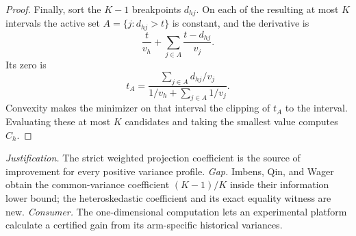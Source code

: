 \documentclass{article}
\begin{document}
\begin{proof}
Finally, sort the \(K-1\) breakpoints \(d_{hj}\). On each of the resulting at most \(K\) intervals the active set \(A=\{j:d_{hj}>t\}\) is constant, and the derivative is
\[
 \frac{t}{v_h}+\sum_{j\in A}\frac{t-d_{hj}}{v_j}.
\]
Its zero is
\[
 t_A=\frac{\sum_{j\in A}d_{hj}/v_j}
 {1/v_h+\sum_{j\in A}1/v_j}.
\]
Convexity makes the minimizer on that interval the clipping of \(t_A\) to the interval. Evaluating these at most \(K\) candidates and taking the smallest value computes \(C_h\).
\end{proof}
\par\smallskip\noindent \textit{Justification.} The strict weighted projection coefficient is the source of improvement for every positive variance profile. \textit{Gap.} Imbens, Qin, and Wager obtain the common-variance coefficient \((K-1)/K\) inside their information lower bound; the heteroskedastic coefficient and its exact equality witness are new. \textit{Consumer.} The one-dimensional computation lets an experimental platform calculate a certified gain from its arm-specific historical variances.
\end{document}
